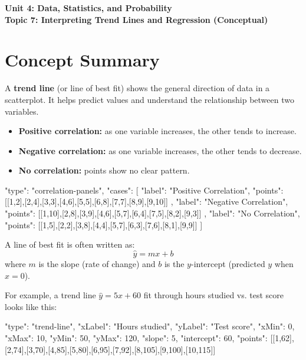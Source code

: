 \documentclass[14pt]{extarticle}
\begin{document}
\raggedright
{}

\begin{center}
    \LARGE \textbf{Unit 4: Data, Statistics, and Probability} \\[6pt]
    \Large \textbf{Topic 7: Interpreting Trend Lines and Regression (Conceptual)}
\end{center}

\vspace{1em}

\section*{Concept Summary}

A \textbf{trend line} (or line of best fit) shows the general direction of data in a scatterplot.  
It helps predict values and understand the relationship between two variables.

\begin{itemize}
  \item \textbf{Positive correlation:} as one variable increases, the other tends to increase.
  \item \textbf{Negative correlation:} as one variable increases, the other tends to decrease.
  \item \textbf{No correlation:} points show no clear pattern.
\end{itemize}

\begin{diagramdata}
{
  "type": "correlation-panels",
  "cases": [
    {
      "label": "Positive Correlation",
      "points": [[1,2],[2,4],[3,3],[4,6],[5,5],[6,8],[7,7],[8,9],[9,10]]
    },
    {
      "label": "Negative Correlation",
      "points": [[1,10],[2,8],[3,9],[4,6],[5,7],[6,4],[7,5],[8,2],[9,3]]
    },
    {
      "label": "No Correlation",
      "points": [[1,5],[2,2],[3,8],[4,4],[5,7],[6,3],[7,6],[8,1],[9,9]]
    }
  ]
}
\end{diagramdata}

A line of best fit is often written as:
\[
\hat{y} = mx + b
\]
where \(m\) is the slope (rate of change) and \(b\) is the \(y\)-intercept (predicted \(y\) when \(x=0\)).

For example, a trend line \(\hat{y} = 5x + 60\) fit through hours studied vs. test score looks like this:

\begin{diagramdata}
{
  "type": "trend-line",
  "xLabel": "Hours studied",
  "yLabel": "Test score",
  "xMin": 0,
  "xMax": 10,
  "yMin": 50,
  "yMax": 120,
  "slope": 5,
  "intercept": 60,
  "points": [[1,62],[2,74],[3,70],[4,85],[5,80],[6,95],[7,92],[8,105],[9,100],[10,115]]
}
\end{diagramdata}
\end{document}

